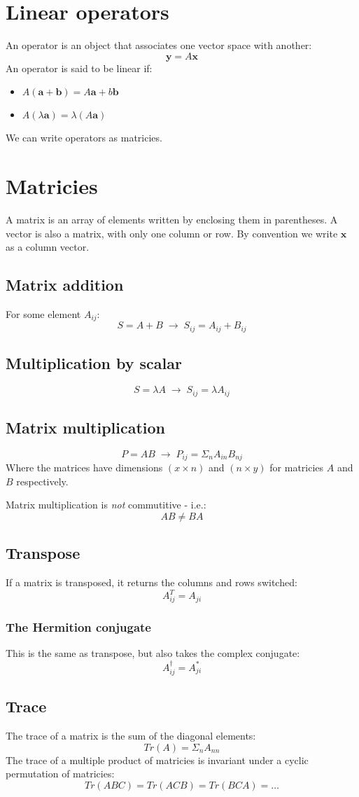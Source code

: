 \section{Linear operators}
An operator is an object that associates one vector space with another:
$$
	\bm{y} = A \bm{x}
$$
An operator is said to be linear if:
\begin{itemize}
	\item $A(\bm{a} + \bm{b}) = A\bm{a} + b\bm{b}$
	\item $A(\lambda\bm{a}) = \lambda (A\bm{a})$
\end{itemize}
We can write operators as matricies.

\section{Matricies}
A matrix is an array of elements written by enclosing them in parentheses. A
vector is also a matrix, with only one column or row. By convention we write
$\bm{x}$ as a column vector.

\subsection{Matrix addition}
For some element $A_{ij}$:
$$
	S = A + B \; \rightarrow \; S_{ij} = A_{ij} + B_{ij}
$$

\subsection{Multiplication by scalar}
$$
	S = \lambda A \; \rightarrow \; S_{ij} = \lambda A_{ij}
$$

\subsection{Matrix multiplication}
$$
	P = AB \; \rightarrow \; P_{ij} = \Sigma_n A_{in}B_{nj}
$$
Where the matrices have dimensions $(x \times n)$ and $(n \times y)$ for
matricies $A$ and $B$ respectively.

Matrix multiplication is \emph{not} commutitive - i.e.:
$$
	AB \neq BA
$$

\subsection{Transpose}
If a matrix is transposed, it returns the columns and rows switched:
$$
	A_{ij}^{T} = A_{ji}
$$
\subsubsection{The Hermition conjugate}
This is the same as transpose, but also takes the complex conjugate:
$$
	A_{ij}^{\dagger} = A^*_{ji}
$$

\subsection{Trace}
The trace of a matrix is the sum of the diagonal elements:
$$
	Tr(A) = \Sigma_n A_{nn}
$$
The trace of a multiple product of matricies is invariant under a cyclic
permutation of matricies:
$$
	Tr(ABC) = Tr(ACB) = Tr(BCA) = \hdots
$$

